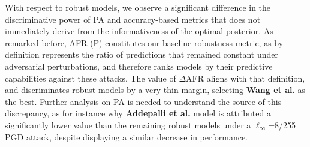 With respect to robust models, we observe a significant difference in the 
discriminative power of PA and accuracy-based metrics that does not immediately
derive from the informativeness of the optimal posterior. As remarked before, AFR (P)
constitutes our baseline robustness metric, as by definition represents the ratio
of predictions that remained constant under adversarial perturbations, and
therefore ranks models by their predictive capabilities against these attacks. The
value of $\Delta$AFR aligns with that definition, and discriminates robust models
by a very thin margin, selecting {\color{tab:brown} \textbf{Wang et al.}} as
the best. Further analysis on PA is needed to understand the source of this 
discrepancy, as for instance why {\color{tab:purple} \textbf{Addepalli et al.}} model
is attributed a significantly lower value than the remaining robust models
under a $\ell_\infty$=8/255 PGD attack, despite displaying a similar decrease in performance. \\


